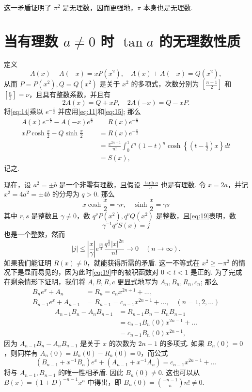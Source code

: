 这一矛盾证明了 $\pi^2$ 是无理数，因而更强地，$\pi$ 本身也是无理数.

\section{当有理数 $a \neq 0$ 时 $\tan a$ 的无理数性质}

定义
\[ A(x) - A(-x) = x P(x^2), \quad A(x) + A(-x) = Q(x^2), \]
从而 $P=P(x^2), Q=Q(x^2)$ 是关于 $x^2$ 的多项式，次数分别为 $[\frac{n-1}{2}]$ 和 $[\frac{n}{2}] = \nu$，且具有整数系数，并且有
\[ 2A(x) = Q+xP, \quad 2A(-x) = Q-xP. \]
将\eqref{eq:14}乘以 $e^{-\frac{x}{2}}$ 并应用\eqref{eq:11}和\eqref{eq:15}; 那么
\begin{equation} \begin{aligned} A(x) e^{-\frac{x}{2}} - A(-x)e^{\frac{x}{2}} &= R(x) e^{-\frac{x}{2}} \\ xP \cosh \frac{x}{2} - Q \sinh \frac{x}{2} &= R(x)e^{-\frac{x}{2}} \\ &= \frac{x^{2n+1}}{n!} \int_{0}^{1} t^{n} (1-t)^{n} \cosh\left\{\left(t-\frac{1}{2}\right)x\right\} dt \\ &= S(x), \end{aligned} \tag{19}\label{eq:19} \end{equation}
记之.

现在，设 $a^2=\pm b$ 是一个非零有理数，且假设 $\frac{\tanh a}{a}$ 也是有理数. 令 $x=2a$，并记 $x^2=4a^2=\pm 4b$ 的分母为 $q > 0$. 那么
\[ x\cosh \frac{x}{2}=\gamma r, \quad \sinh \frac{x}{2}=\gamma s \]
其中 $r, s$ 是整数且 $\gamma \neq 0$，数 $q^\nu P(x^2), q^\nu Q(x^2)$ 是整数，且\eqref{eq:19}表明，数
\[ \gamma^{-1} q^{\nu} S(x) = j \]
也是一个整数，然而
\[ |j| \leq \left| \frac{x}{\gamma} \right| e^{\frac{|x|}{2}}  \frac{q^{\frac{n}{2}}|x|^{2n}}{n!} \longrightarrow 0 \quad (n \longrightarrow \infty). \]
如果我们能证明 $R(x) \neq 0$，就能获得所需的矛盾. 这一不等式在 $x^2 \geq -\pi^2$ 的情况下是显而易见的，因为此时\eqref{eq:19}中的被积函数对 $0 < t < 1$ 是正的. 为了完成在剩余情形下证明，我们将 $A, B, R, c$ 更显式地写为 $A_n, B_n, R_n, c_n$; 那么
\[ \begin{aligned} B_n e^{x} + A_n &= R_n = c_n x^{2n+1} + \dots, \\ B_{n-1} e^{x} + A_{n-1} &= R_{n-1} = c_{n-1} x^{2n-1} + \dots, \quad (n = 1, 2, \dots) \end{aligned} \]
\begin{equation} \begin{aligned} A_{n-1} B_n - A_n B_{n-1} &= R_{n-1} B_n - R_n B_{n-1} \\ &= c_{n-1} B_n(0) x^{2n-1} + \dots \\ &= c_{n-1} B_n(0) x^{2n-1}, \end{aligned} \tag{20}\label{eq:20} \end{equation}
因为 $A_{n-1} B_n - A_n B_{n-1}$ 是关于 $x$ 的次数为 $2n-1$ 的多项式. 如果 $B_n(0) = 0$，则同样有 $A_n(0) = B_n(0) - R_n(0) = 0$，而公式
\[ (B_{n-1} + x^{-1}B_n)e^{x} + (A_{n-1} + x^{-1}A_n) = c_{n-1}x^{2n-1} + \dots \]
将与 $A_{n-1}, B_{n-1}$ 的唯一性相矛盾. 因此 $B_n(0) \neq 0$. 这也可以从 $B(x) = (1+D)^{-n-1}x^n$ 中得出，即 $B_{n}(0)= \binom{-n-1}{n}n! \neq 0$.

